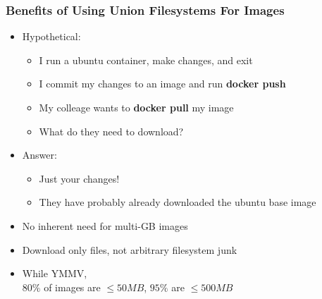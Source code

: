 \documentclass[xcolor=dvipsnames]{beamer}
\newcommand{\cpause}{}
\begin{document}
\begin{frame}[fragile]
 \frametitle{Benefits of Using Union Filesystems For Images}

  \begin{itemize}
    \item Hypothetical:
      \begin{itemize}
      \item I run a ubuntu container, make changes, and exit \cpause
      \item I commit my changes to an image and run \textbf{docker push} \cpause
      \item My colleage wants to \textbf{docker pull} my image \cpause
      \item What do they need to download? \cpause
      \end{itemize}
    \item Answer: 
      \begin{itemize}
      \item Just your changes! \cpause
      \item They have probably already downloaded the ubuntu base image
      \end{itemize}
    \item No inherent need for multi-GB images \cpause
    \item Download only files, not arbitrary filesystem junk \cpause
    \item While YMMV, \\ $80\%$ of images are $\leq50MB$, $95\%$ are $\leq500MB$ 
  \end{itemize}

\end{frame}
\end{document}
